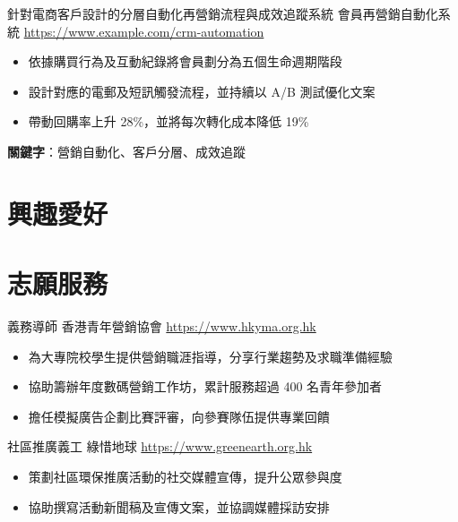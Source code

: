 \documentclass[a4paper, serif, 10pt]{moderncv}
\begin{document}
        {針對電商客戶設計的分層自動化再營銷流程與成效追蹤系統}
        {會員再營銷自動化系統}
        {\url{https://www.example.com/crm-automation}}
        {}
        {\begin{itemize}
\item 依據購買行為及互動紀錄將會員劃分為五個生命週期階段
\item 設計對應的電郵及短訊觸發流程，並持續以 A/B 測試優化文案
\item 帶動回購率上升 28\%，並將每次轉化成本降低 19\%
\end{itemize}
\textbf{關鍵字}：營銷自動化、客戶分層、成效追蹤}
\section{興趣愛好}

\section{志願服務}

        {義務導師}
        {香港青年營銷協會}
        {\url{https://www.hkyma.org.hk}}
        {}
        {\begin{itemize}
\item 為大專院校學生提供營銷職涯指導，分享行業趨勢及求職準備經驗
\item 協助籌辦年度數碼營銷工作坊，累計服務超過 400 名青年參加者
\item 擔任模擬廣告企劃比賽評審，向參賽隊伍提供專業回饋
\end{itemize}}
    

        {社區推廣義工}
        {綠惜地球}
        {\url{https://www.greenearth.org.hk}}
        {}
        {\begin{itemize}
\item 策劃社區環保推廣活動的社交媒體宣傳，提升公眾參與度
\item 協助撰寫活動新聞稿及宣傳文案，並協調媒體採訪安排
\end{itemize}}
    
\end{document}
